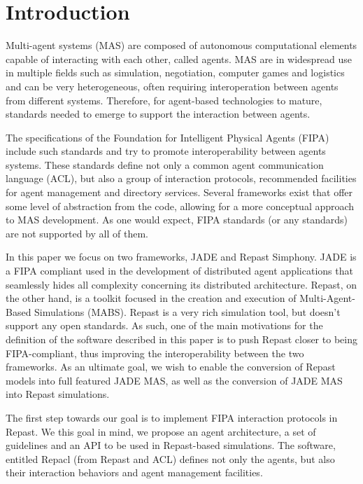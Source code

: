 \section{Introduction} %
\label{sec:introduction}

Multi-agent systems (MAS) are composed of autonomous computational elements capable of interacting with each other, called agents.
\cite{wooldridge2008introduction}
MAS are in widespread use in multiple fields such as simulation, negotiation, computer games and logistics and can be very heterogeneous, often requiring interoperation between agents from different systems. \cite{wooldridge2008introduction}
Therefore, for agent-based technologies to mature, standards needed to emerge to support the interaction between agents.

The specifications of the Foundation for Intelligent Physical Agents (FIPA) include such standards and try to promote interoperability between agents systems. These standards define not only a common agent communication language (ACL), but also a group of interaction protocols, recommended facilities for agent management and directory services. \cite{o1998fipa} Several frameworks exist that offer some level of abstraction from the code, allowing for a more conceptual approach to MAS development. As one would expect, FIPA standards (or any standards) are not supported by all of them. \cite{gormer2011jrep}

In this paper we focus on two frameworks, JADE and Repast Simphony. JADE is a FIPA compliant used in the development of distributed agent applications that seamlessly hides all complexity concerning its distributed architecture. \cite{bellifemine2003jade} Repast, on the other hand, is a toolkit focused in the creation and execution of Multi-Agent-Based Simulations (MABS). Repast is a very rich simulation tool, but doesn't support any open standards. \cite{collier2003repast} As such, one of the main motivations for the definition of the software described in this paper is to push Repast closer to being FIPA-compliant, thus improving the interoperability between the two frameworks. As an ultimate goal, we wish to enable the conversion of Repast models into full featured JADE MAS, as well as the conversion of JADE MAS into Repast simulations.

The first step towards our goal is to implement FIPA interaction protocols in Repast.
We this goal in mind, we propose an agent architecture, a set of guidelines and an API to be used in Repast-based simulations.
The software, entitled Repacl (from Repast and ACL) defines not only the agents, but also their interaction behaviors and agent management facilities.

